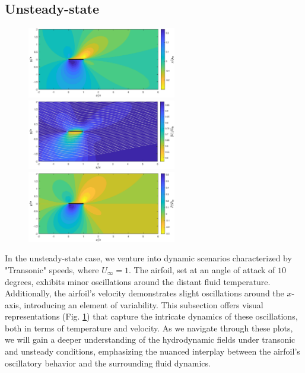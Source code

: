 \subsection{Unsteady-state}
\begin{figure}
\caption{}
    \includegraphics[width=0.58\textwidth]{drawings/U1_alpha10_density.eps}
    \vspace{0.07cm}
    \includegraphics[width=0.58\textwidth]{drawings/U1_alpha10_velocity.eps}
    \vspace{0.07cm}
    \includegraphics[width=0.58\textwidth]{drawings/U1_alpha10_pressure.eps}
    \vspace{0.07cm}
    \begin{minipage}{0.58\textwidth}
    \end{minipage}
    \label{fig:unsteady_state}
\end{figure}
In the unsteady-state case, we venture into dynamic scenarios characterized by "Transonic" speeds, where $U_\infty = 1$. The airfoil, set at an angle of attack of $10$ degrees, exhibits minor oscillations around the distant fluid temperature. Additionally, the airfoil's velocity demonstrates slight oscillations around the $x$-axis, introducing an element of variability. This subsection offers visual representations (Fig. \ref{fig:unsteady_state}) that capture the intricate dynamics of these oscillations, both in terms of temperature and velocity. As we navigate through these plots, we will gain a deeper understanding of the hydrodynamic fields under transonic and unsteady conditions, emphasizing the nuanced interplay between the airfoil's oscillatory behavior and the surrounding fluid dynamics.

